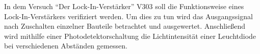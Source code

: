 In dem Versuch \enquote{Der Lock-In-Verstärker} V303 soll die Funktionsweise eines Lock-In-Verstärkers verifiziert werden.
Um dies zu tun wird das Ausgangssignal nach Zuschalten
einzelner Bauteile betrachtet und ausgewertet. Anschließend wird
mithilfe einer Photodetektorschaltung die Lichtintensität einer Leuchtdiode bei verschiedenen Abständen gemessen.
